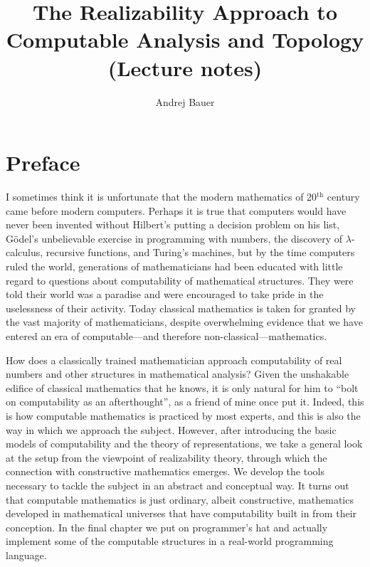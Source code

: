 \documentclass[11pt,a4paper,twoside]{book}
\begin{document}
\title{
  The Realizability Approach to\\
  Computable Analysis and Topology\\
  (Lecture notes)
}

\author{Andrej Bauer}

\maketitle


\chapter*{Preface}

I sometimes think it is unfortunate that the modern mathematics of
20${}^{\text{th}}$ century came before modern computers. Perhaps it is
true that computers would have never been invented without Hilbert's
putting a decision problem on his list, G\"odel's unbelievable
exercise in programming with numbers, the discovery of
$\lambda$-calculus, recursive functions, and Turing's machines, but by
the time computers ruled the world, generations of mathematicians had
been educated with little regard to questions about computability of
mathematical structures. They were told their world was a paradise and
were encouraged to take pride in the uselessness of their activity.
Today classical mathematics is taken for granted by the vast majority
of mathematicians, despite overwhelming evidence that we have entered
an era of computable---and therefore non-classical---mathematics.

How does a classically trained mathematician approach computability of
real numbers and other structures in mathematical analysis? Given the
unshakable edifice of classical mathematics that he knows, it is only
natural for him to ``bolt on computability as an afterthought'', as a
friend of mine once put it. Indeed, this is how computable mathematics
is practiced by most experts, and this is also the way in which we
approach the subject. However, after introducing the basic models of
computability and the theory of representations, we take a general
look at the setup from the viewpoint of realizability theory, through
which the connection with constructive mathematics emerges. We develop
the tools necessary to tackle the subject in an abstract and
conceptual way. It turns out that computable mathematics is just
ordinary, albeit constructive, mathematics developed in mathematical
universes that have computability built in from their conception. In
the final chapter we put on programmer's hat and actually implement
some of the computable structures in a real-world programming
language.
\end{document}
